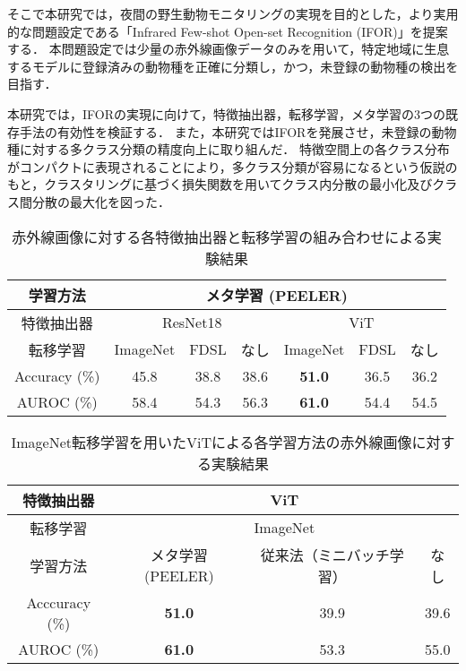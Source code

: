 \documentclass[uplatex,dvipdfmx,10pt,twocolumn]{jsarticle}
\begin{document}
そこで本研究では，夜間の野生動物モニタリングの実現を目的とした，より実用的な問題設定である「Infrared Few-shot Open-set Recognition (IFOR)」を提案する．
本問題設定では少量の赤外線画像データのみを用いて，特定地域に生息するモデルに登録済みの動物種を正確に分類し，かつ，未登録の動物種の検出を目指す．

本研究では，IFORの実現に向けて，特徴抽出器，転移学習，メタ学習の3つの既存手法の有効性を検証する．
また，本研究ではIFORを発展させ，未登録の動物種に対する多クラス分類の精度向上に取り組んだ．
特徴空間上の各クラス分布がコンパクトに表現されることにより，多クラス分類が容易になるという仮説のもと，クラスタリングに基づく損失関数を用いてクラス内分散の最小化及びクラス間分散の最大化を図った．

\begin{table*}[tbp]
  \centering
	\caption{赤外線画像に対する各特徴抽出器と転移学習の組み合わせによる実験結果}
  \label{tbl:detection}
	\small
  \begin{tabular}{c||c|c|c|c|c|c}
    \hline
    学習方法            & \multicolumn{6}{c}{メタ学習 (PEELER)}                        \\ \hline
    特徴抽出器           & \multicolumn{3}{c|}{ResNet18} & \multicolumn{3}{c}{ViT}     \\ \hline
    転移学習            &  ImageNet  &  FDSL  &  なし   &   ImageNet    & FDSL & なし  \\ \hline\hline
    Accuracy (\%) &    45.8    &  38.8  &  38.6  & \textbf{51.0} & 36.5 & 36.2 \\
    AUROC (\%)   &    58.4    &  54.3  &  56.3  & \textbf{61.0} & 54.4 & 54.5 \\ \hline
  \end{tabular}
  \vspace{-4mm}
\end{table*}
\begin{table*}[tbp]
  \centering
  \caption{ImageNet転移学習を用いたViTによる各学習方法の赤外線画像に対する実験結果}
  \label{tbl:meta}
	\small
  \begin{tabular}{c||c|c|c}
    \hline
    特徴抽出器          &          \multicolumn{3}{c}{ViT}                \\ \hline
    転移学習            &          \multicolumn{3}{c}{ImageNet}           \\ \hline
    学習方法            & メタ学習 (PEELER)  & 従来法（ミニバッチ学習） & なし  \\ \hline\hline
    Acccuracy (\%)    &  \textbf{51.0}   &        39.9          & 39.6  \\
    AUROC (\%)        &  \textbf{61.0}   &        53.3          & 55.0  \\ \hline
  \end{tabular}
\end{table*}
\end{document}
